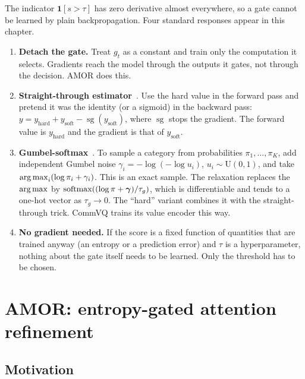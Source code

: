 The indicator $\mathbf{1}[s>\tau]$ has zero derivative almost everywhere, so a gate cannot be learned
by plain backpropagation. Four standard responses appear in this chapter.
\begin{enumerate}
  \item \textbf{Detach the gate.} Treat $g_t$ as a constant and train only the computation it
        selects. Gradients reach the model through the outputs it gates, not through the decision.
        AMOR does this.
  \item \textbf{Straight-through estimator}~\citep{c10-bengio2013ste}. Use the hard value in the
        forward pass and pretend it was the identity (or a sigmoid) in the backward pass:
        $y = y_{\text{hard}} + y_{\text{soft}} - \operatorname{sg}(y_{\text{soft}})$, where $\operatorname{sg}$
        stops the gradient. The forward value is $y_{\text{hard}}$ and the gradient is that of $y_{\text{soft}}$.
  \item \textbf{Gumbel-softmax}~\citep{c10-jang2017gumbel,c10-maddison2017concrete}. To sample a
        category from probabilities $\pi_1,\dots,\pi_K$, add independent Gumbel noise
        $\gamma_i=-\log(-\log u_i)$, $u_i\sim\mathrm{U}(0,1)$, and take $\operatorname*{arg\,max}_i(\log\pi_i+\gamma_i)$.
        This is an exact sample. The relaxation replaces the $\operatorname*{arg\,max}$ by
        $\operatorname{softmax}((\log\pi+\bm{\gamma})/\tau_g)$, which is differentiable and tends to a one-hot vector
        as $\tau_g\to 0$. The ``hard'' variant combines it with the straight-through trick. CommVQ
        trains its value encoder this way.
  \item \textbf{No gradient needed.} If the score is a fixed function of quantities that are trained
        anyway (an entropy or a prediction error) and $\tau$ is a hyperparameter, nothing about the
        gate itself needs to be learned. Only the threshold has to be chosen.
\end{enumerate}

\section{AMOR: entropy-gated attention refinement}\label{sec:c13-amor}

\subsection{Motivation}

